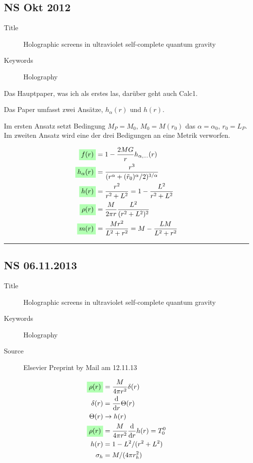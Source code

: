 \documentclass[10pt,a4paper, fleqn]{article}
\newcommand{\highlight}[1]{%
  \colorbox{green!30}{$\displaystyle#1$}}
\begin{document}
\begin{multicols}{2}
\subsection{NS Okt 2012} \label{NS2012}
\begin{description}
  \item[Title] Holographic screens in ultraviolet self-complete quantum gravity
  \item[Keywords] Holography
\end{description}

Das Hauptpaper, was ich als erstes las, darüber geht auch Calc1.

Das Paper umfasst zwei Ansätze, $h_\alpha(r)$ und $h(r)$.

Im ersten Ansatz setzt Bedingung $M_P=M_0$, $M_0=M(r_0)$ das $\alpha = \alpha_0$, $r_0 = L_P$. Im zweiten Ansatz wird eine der drei Bedigungen an eine Metrik verworfen.

\vfill
\columnbreak

\begin{align}
\highlight{ f(r) } &= 1 - \frac{2 M G}{r} h_{\alpha, \dots}(r) \\
\highlight{ h_\alpha(r) } &= \frac{r^3}{(r^\alpha + (\tilde{r}_0)^\alpha / 2)^{3/\alpha}}\\
\highlight{ h(r) } &= \frac{r^2}{r^2 + L^2} = 1 - \frac{L^2}{r^2 + L^2} \\
\highlight{ \rho(r) } &= \frac{M}{2\pi r} \frac{L^2}{(r^2 + L^2)^2} \\
\highlight{ m(r) } &= \frac{Mr^2}{L^2 + r^2} = M - \frac{LM}{L^2 + r^2}
\end{align}
\end{multicols}
\rule{0.9\textwidth}{0.4pt}
\begin{multicols}{2}
\subsection{NS 06.11.2013} \label{NS2013}
\begin{description}
  \item[Title] Holographic screens in ultraviolet self-complete quantum gravity
  \item[Keywords] Holography
  \item[Source] Elsevier Preprint by Mail am 12.11.13
\end{description}

\vfill
\columnbreak

\begin{align}
\highlight{ \rho(r) } &= \frac{M}{4 \pi r^2} \delta(r) \\
\delta(r) &= \dd{}{r} \Theta(r) \\
\Theta(r) &\to h(r) \\
\highlight{ \rho(r) } &= \frac{M}{4 \pi r^2} \dd{}{r} h(r) = T^0_0 \\
h(r) &= 1 - L^2 / (r^2 + L^2) \\
\sigma_h &= M / (4 \pi r_h^2)
\end{align}
\end{multicols}
\end{document}
